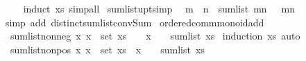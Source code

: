 \begin{isabellebody}
%
\isadelimproof
\ \ %
\endisadelimproof
%
\isatagproof
{}\isamarkupfalse%
\ {\isacharparenleft}{\kern0pt}induct\ xs{\isacharparenright}{\kern0pt}\ simp{\isacharunderscore}{\kern0pt}all%
\endisatagproof
{\isafoldproof}%
%
\isadelimproof
\isanewline
%
\endisadelimproof
\isanewline
{}\isamarkupfalse%
\ sum{\isacharunderscore}{\kern0pt}list{\isacharunderscore}{\kern0pt}upt{\isacharbrackleft}{\kern0pt}simp{\isacharbrackright}{\kern0pt}{\isacharcolon}{\kern0pt}\isanewline
\ \ {\isachardoublequoteopen}m\ {\isasymle}\ n\ {\isasymLongrightarrow}\ sum{\isacharunderscore}{\kern0pt}list\ {\isacharbrackleft}{\kern0pt}m{\isachardot}{\kern0pt}{\isachardot}{\kern0pt}{\isacharless}{\kern0pt}n{\isacharbrackright}{\kern0pt}\ {\isacharequal}{\kern0pt}\ {\isasymSum}\ {\isacharbraceleft}{\kern0pt}m{\isachardot}{\kern0pt}{\isachardot}{\kern0pt}{\isacharless}{\kern0pt}n{\isacharbraceright}{\kern0pt}{\isachardoublequoteclose}\isanewline
%
\isadelimproof
%
\endisadelimproof
%
\isatagproof
{}\isamarkupfalse%
{\isacharparenleft}{\kern0pt}simp\ add{\isacharcolon}{\kern0pt}\ distinct{\isacharunderscore}{\kern0pt}sum{\isacharunderscore}{\kern0pt}list{\isacharunderscore}{\kern0pt}conv{\isacharunderscore}{\kern0pt}Sum{\isacharparenright}{\kern0pt}%
\endisatagproof
{\isafoldproof}%
%
\isadelimproof
\isanewline
%
\endisadelimproof
\isanewline
{}\isamarkupfalse%
\ ordered{\isacharunderscore}{\kern0pt}comm{\isacharunderscore}{\kern0pt}monoid{\isacharunderscore}{\kern0pt}add\isanewline
{}\isanewline
\isanewline
{}\isamarkupfalse%
\ sum{\isacharunderscore}{\kern0pt}list{\isacharunderscore}{\kern0pt}nonneg{\isacharcolon}{\kern0pt}\ {\isachardoublequoteopen}{\isacharparenleft}{\kern0pt}{\isasymAnd}x{\isachardot}{\kern0pt}\ x\ {\isasymin}\ set\ xs\ {\isasymLongrightarrow}\ {}\ {\isasymle}\ x{\isacharparenright}{\kern0pt}\ {\isasymLongrightarrow}\ {}\ {\isasymle}\ sum{\isacharunderscore}{\kern0pt}list\ xs{\isachardoublequoteclose}\isanewline
%
\isadelimproof
%
\endisadelimproof
%
\isatagproof
{}\isamarkupfalse%
\ {\isacharparenleft}{\kern0pt}induction\ xs{\isacharparenright}{\kern0pt}\ auto%
\endisatagproof
{\isafoldproof}%
%
\isadelimproof
\isanewline
%
\endisadelimproof
\isanewline
{}\isamarkupfalse%
\ sum{\isacharunderscore}{\kern0pt}list{\isacharunderscore}{\kern0pt}nonpos{\isacharcolon}{\kern0pt}\ {\isachardoublequoteopen}{\isacharparenleft}{\kern0pt}{\isasymAnd}x{\isachardot}{\kern0pt}\ x\ {\isasymin}\ set\ xs\ {\isasymLongrightarrow}\ x\ {\isasymle}\ {}{\isacharparenright}{\kern0pt}\ {\isasymLongrightarrow}\ sum{\isacharunderscore}{\kern0pt}list\ xs\ {\isasymle}\ {}{\isachardoublequoteclose}\isanewline

\end{isabellebody}

